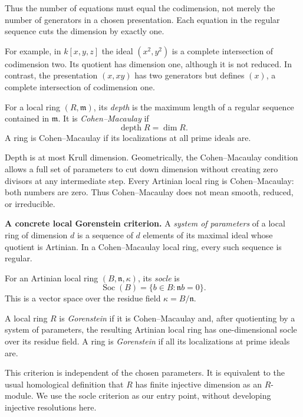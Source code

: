 Thus the number of equations must equal
the codimension, not merely the number
of generators in a chosen presentation.
Each equation in the regular sequence
cuts the dimension by exactly one.

For example, in $k[x,y,z]$ the ideal
$(x^2,y^2)$ is a complete intersection
of codimension two. Its quotient has
dimension one, although it is not reduced.
In contrast, the presentation $(x,xy)$
has two generators but defines $(x)$,
a complete intersection of codimension one.

\begin{definition}
\label{definition-depth-cm}
For a local ring $(R,\mathfrak m)$, its
{\it depth} is the maximum length of a
regular sequence contained in $\mathfrak m$.
It is {\it Cohen--Macaulay} if
$$
\operatorname{depth}R=\dim R.
$$
A ring is Cohen--Macaulay if its
localizations at all prime ideals are.
\end{definition}

Depth is at most Krull dimension.
Geometrically, the Cohen--Macaulay condition
allows a full set of parameters to cut down
dimension without creating zero divisors at
any intermediate step. Every Artinian local
ring is Cohen--Macaulay: both numbers are
zero. Thus Cohen--Macaulay does not mean
smooth, reduced, or irreducible.

\medskip\noindent
{\bf A concrete local Gorenstein criterion.}
A {\it system of parameters} of a local
ring of dimension $d$ is a sequence of $d$
elements of its maximal ideal whose quotient
is Artinian. In a Cohen--Macaulay local ring,
every such sequence is regular.

\begin{definition}
\label{definition-socle}
For an Artinian local ring
$(B,\mathfrak n,\kappa)$, its {\it socle} is
$$
\operatorname{Soc}(B)
=\{b\in B:\mathfrak n b=0\}.
$$
This is a vector space over the residue
field $\kappa=B/\mathfrak n$.
\end{definition}

\begin{definition}
\label{definition-gorenstein-local}
A local ring $R$ is {\it Gorenstein} if it
is Cohen--Macaulay and, after quotienting by
a system of parameters, the resulting
Artinian local ring has one-dimensional
socle over its residue field.
A ring is {\it Gorenstein} if all its
localizations at prime ideals are.
\end{definition}

This criterion is independent of the chosen
parameters. It is equivalent to the usual
homological definition that $R$ has finite
injective dimension as an $R$-module.
We use the socle criterion as our entry
point, without developing injective
resolutions here.

